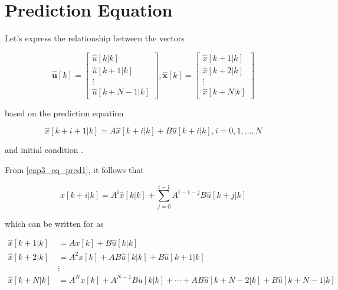 \section{Prediction Equation}

Let's express the relationship between the vectors

\begin{equation}
	\mathbf{\hat{u}}[k] = \left[
		\begin{matrix}
			\hat{u}[k | k] \\ 
			\hat{u}[k + 1 | k] \\ 
			\vdots \\ 
			\hat{u}[k + N-1 | k]
		\end{matrix}
	\right],
	\mathbf{\hat{x}}[k] = 
		\left[
		\begin{matrix}
			\hat{x}[k + 1 | k] \\ 
			\hat{x}[k + 2 | k] \\ 
			\vdots \\ 
			\hat{x}[k + N | k]
		\end{matrix}
	\right]
\end{equation}

\noindent
based on the prediction equation

\noindent
\begin{equation}
	\label{cap3_eq_pred1}
	\hat{x}[k + i +1|k] = A\hat{x}[k+i|k] + B \hat{u}[k+i|k], 
	i = 0, 1, \ldots, N 
\end{equation}

\noindent
and initial condition .

From \eqref{cap3_eq_pred1}, it follows that

\begin{equation}
	\hat{x}[k+i|k] = A^i\hat{x}[k|k] + \sum_{j=0}^{i-1} A^{i - 1 -j} B \hat{u}[k+j|k]
\end{equation}

\noindent
which can be written for  as

\noindent
\begin{align}
	\hat{x}[k+1|k] &= A x[k] +  B \hat{u}[k|k] \\
	\hat{x}[k+2|k] &= A^2 x[k] + A B \hat{u}[k|k] +  B \hat{u}[k+1|k] \\
	&\vdots \\
	\hat{x}[k+N|k] &= A^N x[k] + A^{N - 1} B \hat{u}[k|k] + \cdots + A B \hat{u}[k +N - 2|k] +  B \hat{u}[k + N - 1|k]
\end{align}

